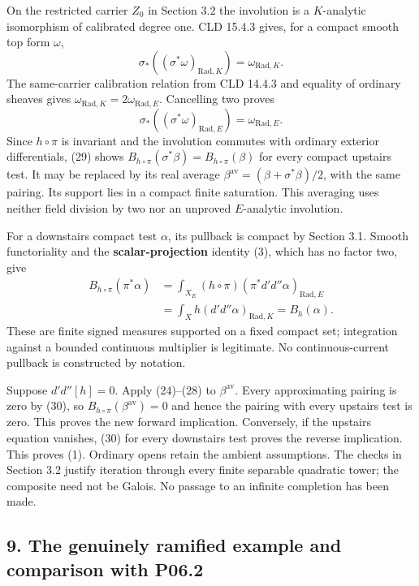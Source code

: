 \documentclass[
  11pt,
]{article}
\begin{document}
On the restricted carrier \(Z_0\) in Section 3.2 the involution is a
\(K\)-analytic isomorphism of calibrated degree one. CLD 15.4.3 gives,
for a compact smooth top form \(\omega\), \[
 \sigma_*((\sigma^*\omega)_{\mathrm{Rad},K})
                      =\omega_{\mathrm{Rad},K}.
\] The same-carrier calibration relation from CLD 14.4.3 and equality of
ordinary sheaves gives
\(\omega_{\mathrm{Rad},K}=2\omega_{\mathrm{Rad},E}\). Cancelling two
proves \[
 \sigma_*((\sigma^*\omega)_{\mathrm{Rad},E})
                      =\omega_{\mathrm{Rad},E}.             \tag{29}
\] Since \(h\circ\pi\) is invariant and the involution commutes with
ordinary exterior differentials, (29) shows
\(B_{h\circ\pi}(\sigma^*\beta)=B_{h\circ\pi}(\beta)\) for every compact
upstairs test. It may be replaced by its real average
\(\beta^{\mathrm{av}}=(\beta+\sigma^*\beta)/2\), with the same pairing.
Its support lies in a compact finite saturation. This averaging uses
neither field division by two nor an unproved \(E\)-analytic involution.

For a downstairs compact test \(\alpha\), its pullback is compact by
Section 3.1. Smooth functoriality and the \textbf{scalar-projection}
identity (3), which has no factor two, give \[
 \begin{split}
 B_{h\circ\pi}(\pi^*\alpha)
 &=\int_{X_E}(h\circ\pi)(\pi^*d'd''\alpha)_{\mathrm{Rad},E}\\
 &=\int_X h(d'd''\alpha)_{\mathrm{Rad},K}=B_h(\alpha).
 \end{split}                                                \tag{30}
\] These are finite signed measures supported on a fixed compact set;
integration against a bounded continuous multiplier is legitimate. No
continuous-current pullback is constructed by notation.

Suppose \(d'd''[h]=0\). Apply (24)--(28) to \(\beta^{\mathrm{av}}\).
Every approximating pairing is zero by (30), so
\(B_{h\circ\pi}(\beta^{\mathrm{av}})=0\) and hence the pairing with
every upstairs test is zero. This proves the new forward implication.
Conversely, if the upstairs equation vanishes, (30) for every downstairs
test proves the reverse implication. This proves (1). Ordinary opens
retain the ambient assumptions. The checks in Section 3.2 justify
iteration through every finite separable quadratic tower; the composite
need not be Galois. No passage to an infinite completion has been made.

\subsection{9. The genuinely ramified example and comparison with
P06.2}\label{the-genuinely-ramified-example-and-comparison-with-p06.2}
\end{document}
